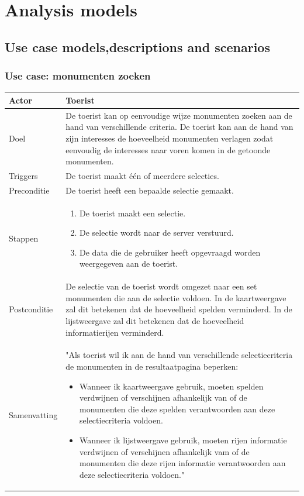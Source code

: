 \documentclass[a4paper,10pt]{article}
\newcommand{\rsection}[1]{
\section{#1}\label{sec:#1}
}
\newcommand{\rsubsection}[1]{
\subsection{#1}\label{sec:sub:#1}
}
\newcommand{\rsubsubsection}[1]{
\subsubsection{#1}\label{sec:sub:sub:#1}
}
\newcommand\addrow[2]{#1 &#2\\ }
\newcommand\addheading[2]{#1 &#2\\ \hline}
\newcommand\tabularhead{\begin{tabular}{| lp{12cm} |}
\hline
}
\newenvironment{usecase}{\tabularhead}{\hline\end{tabular}}
\begin{document}
	\clearpage
	\rsection{Analysis models}
	\rsubsection{Use case models,descriptions and scenarios}
		\rsubsubsection{Use case: monumenten zoeken}
		\begin{usecase}
		\addheading{Actor}{Toerist}
			\addrow{Doel}{De toerist kan op eenvoudige wijze monumenten zoeken aan de hand van verschillende criteria. De toerist kan aan de hand van zijn interesses de hoeveelheid monumenten verlagen zodat eenvoudig de interesses naar voren komen in de getoonde monumenten.}
			\addrow{Triggers}{De toerist maakt \'e\'en of meerdere selecties.}
			\addrow{Preconditie}{De toerist heeft een bepaalde selectie gemaakt.}
			\addrow{Stappen}{
\begin{enumerate}
\item De toerist maakt een selectie. 
\item De selectie wordt naar de server verstuurd. 
\item De data die de gebruiker heeft opgevraagd worden weergegeven aan de toerist.
\end{enumerate}}	
			\addrow{Postconditie}{De selectie van de toerist wordt omgezet naar een set monumenten die aan de selectie voldoen. In de kaartweergave zal dit betekenen dat de hoeveelheid spelden verminderd. In de lijstweergave zal dit betekenen dat de hoeveelheid informatierijen verminderd.}
			\addrow{Samenvatting}{"Als toerist wil ik aan de hand van verschillende selectiecriteria de monumenten in de resultaatpagina beperken:
				\begin{itemize}
					\item Wanneer ik kaartweergave gebruik, moeten spelden verdwijnen of verschijnen afhankelijk van of de monumenten die deze spelden verantwoorden aan deze selectiecriteria voldoen.
					\item Wanneer ik lijstweergave gebruik, moeten rijen informatie verdwijnen of verschijnen afhankelijk vam of de monumenten die deze rijen informatie verantwoorden aan deze selectiecriteria voldoen."
				\end{itemize}}
			\end{usecase}
\end{document}
